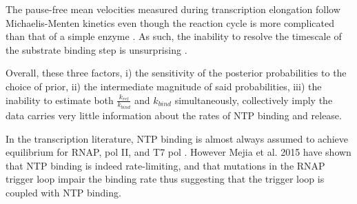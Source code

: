 \documentclass[10pt,letterpaper]{article}
\begin{document}


The pause-free mean velocities measured during transcription elongation follow Michaelis-Menten kinetics
even though the reaction cycle is more complicated than that of a simple enzyme \cite{wong2018structural}. As such, the inability to resolve the timescale of the substrate binding step is unsurprising \cite{briggs1925note, english2006ever, schnell2014validity}.






Overall, these three factors, i) the sensitivity of the posterior probabilities to the choice of prior, ii) the intermediate magnitude of said probabilities, iii) the inability to estimate both $\frac{k_{rel}}{k_{bind}}$ and $k_{bind}$ simultaneously, collectively imply the data carries very little information about the rates of NTP binding and release.




In the transcription literature, NTP binding is almost always assumed to achieve equilibrium for RNAP, pol II, and T7 pol \cite{maoileidigh2011unified, tadigotla2006thermodynamic, bai2004sequence, abbondanzieri2005direct, larson2012trigger, schweikhard2014transcription, Dangkulwanich2013complete, arnold2001kinetic, thomen2008t7, thomen2005unravelling}. However Mejia et al. 2015 \cite{mejia2015trigger} have shown that NTP binding is indeed rate-limiting, and that mutations in the RNAP trigger loop impair the binding rate thus suggesting that the trigger loop is coupled with NTP binding. \par   
\end{document}
